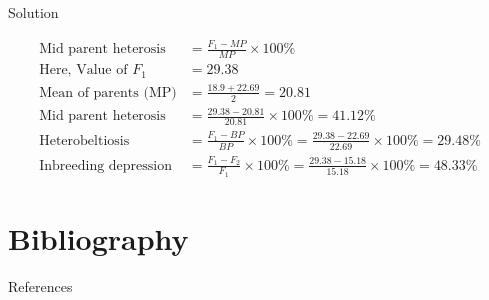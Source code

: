 \documentclass[11pt,dvipsnames,ignorenonframetext,aspectratio=169]{beamer}
\begin{document}
\begin{frame}{Solution}
\protect\hypertarget{solution-1}{}

\begin{equation}
\begin{aligned}
\text{Mid parent heterosis} &= \frac{F_1 - MP}{MP} \times 100\% \\
\text{Here, Value of } F_1 &= 29.38 \\
\text{Mean of parents (MP)} &= \frac{18.9+22.69}{2} = 20.81 \\
\text{Mid parent heterosis } &= \frac{29.38-20.81}{20.81} \times 100\% = 41.12\% \\
\text{Heterobeltiosis} &= \frac{F_1-BP}{BP} \times 100\% = \frac{29.38-22.69}{22.69} \times 100\% = 29.48\% \\
\text{Inbreeding depression} &= \frac{F_1-F_2}{F_1} \times 100\% = \frac{29.38-15.18}{15.18} \times 100\%= 48.33\%
\end{aligned}
\nonumber
\end{equation}

\end{frame}

\hypertarget{bibliography}{%
\section{Bibliography}\label{bibliography}}

\begin{frame}{References}
\protect\hypertarget{references}{}

\end{frame}
\end{document}
